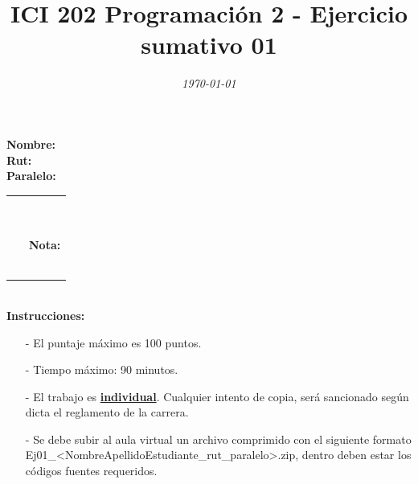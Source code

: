 \documentclass{exam}
\title{\LARGE\color{azul}\textbf{ICI 202 Programaci\'on 2 - Ejercicio sumativo 01 }}
\author{\normalsize \color{gray}{Prof.} \color{black}{\textbf{Ismael Figueroa, Eduardo Godoy}}}
\date{\normalsize \em \today}
\begin{document}

\maketitle

\begin{multicols}{2} \begin{flushleft} \textbf{Nombre:} \\ \vspace*{2mm} \textbf{Rut:} \\ \vspace*{2mm} \textbf{Paralelo:} \end{flushleft} \begin{center} \begin{table}[H] \begin{tabular}{p{4cm}|p{3cm}|} \arrayrulecolor{gray!50}\cline{2-2} ~ & {\em {\scriptsize \color{gray!50}{Puntaje:}}} \\ & ~ \\ ~ & \textbf{Nota:} \\ & ~ \\ \arrayrulecolor{gray!50}\cline{2-2} \end{tabular} \end{table} \end{center} \end{multicols}

\vspace*{-18mm}
\noindent
\textbf{\\Instrucciones:}
\begin{itemize}
    \item[-] El puntaje m\'aximo  es 100 puntos.
    \item[-] Tiempo m\'aximo: 90 minutos.
    \item[-] El trabajo es \underline{\textbf{individual}}. Cualquier intento de copia, ser\'a sancionado seg\'un dicta el reglamento de la carrera.
    \item[-] Se debe subir al aula virtual un archivo comprimido con el siguiente formato \\ {Ej01\_<NombreApellidoEstudiante\_rut\_paralelo>.zip, dentro deben estar los c\'odigos fuentes requeridos.}
\end{itemize}
\end{document}
